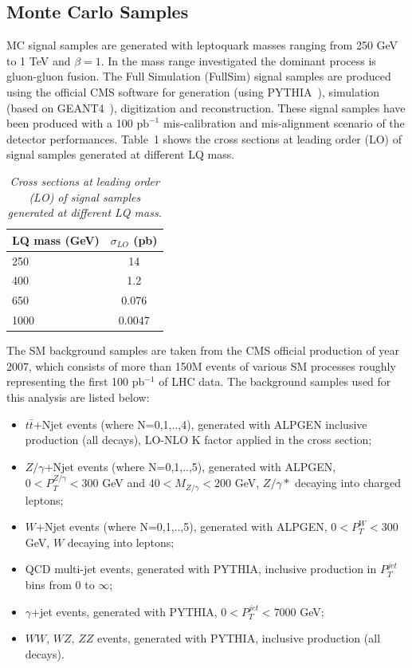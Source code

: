 \documentclass{cmspaper}
\begin{document}
\begin{linenumbers}
\section{Monte Carlo Samples} \label{sec:MCSamples}
MC signal samples are generated with leptoquark masses ranging from 250 GeV to 1 TeV and $\beta=1$. 
In the mass range investigated the dominant process is gluon-gluon fusion. 
The Full Simulation (FullSim) signal samples are produced using 
the official CMS software for generation (using PYTHIA~\cite{PYTHIA}), 
simulation (based on GEANT4~\cite{GEANT4}), digitization and reconstruction. 
These signal samples have been produced with a 100 $\mbox{pb}^{-1}$ mis-calibration and mis-alignment 
scenario of the detector performances. Table~1
shows the cross sections at leading order (LO) of signal samples generated at different LQ mass.

\begin{table}[htb]
  \label{tab:NumEvents}
  \begin{center}
    \begin{tabular}{|l|c|} \hline
      LQ mass (GeV) & $\sigma_{LO}$ (pb) \\ \hline
      250  & 14 \\
      400  & 1.2 \\
      650  & 0.076 \\
      1000 & 0.0047 \\
      \hline
    \end{tabular}
    \caption{\small \sl Cross sections at leading order (LO) of signal samples generated at different LQ mass.}
  \end{center}
\end{table}

The SM background samples are taken from the CMS official production of year 2007, 
which consists of more than 150M events of various SM processes roughly representing the first 100 pb$^{-1}$ of LHC data. 
The background samples used for this analysis are listed below:
\begin{itemize}
%
\item $t\bar{t}$+Njet events (where N=0,1,..,4), generated with ALPGEN \cite{Mangano:2002ea} inclusive production (all decays), LO-NLO K factor applied 
in the cross section; 
%
\item $Z/\gamma$+Njet events (where N=0,1,..,5), generated with ALPGEN, $ 0 < P_{T}^{Z/\gamma} < 300 $ GeV and $40<M_{Z/\gamma}<200$ GeV, 
$Z/\gamma*$ decaying into charged leptons;  
%
\item $W$+Njet events (where N=0,1,..,5), generated with ALPGEN, $ 0 < P_{T}^{W} < 300 $ GeV, $W$ decaying into leptons;  
%
\item QCD multi-jet events, generated with PYTHIA, inclusive production in $P_{T}^{jet}$ bins from 0 to $\infty$;  
%
\item $\gamma$+jet events, generated with PYTHIA, $ 0 < P_{T}^{jet} < 7000 $ GeV;  
%
\item $WW$, $WZ$, $ZZ$ events, generated with PYTHIA, inclusive production (all decays).
\end{itemize} 


\end{linenumbers}
\end{document}
